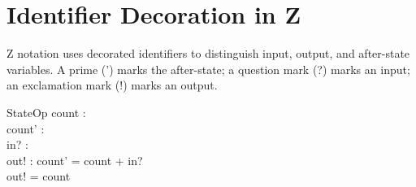 \documentclass[a4paper,10pt,fleqn]{article}
\begin{document}
\section*{Identifier Decoration in Z}

\noindent Z notation uses decorated identifiers to distinguish input, output, and after-state variables. A prime (') marks the after-state; a question mark (?) marks an input; an exclamation mark (!) marks an output.

\bigskip

\begin{schema}{StateOp}
count : \nat \\
count' : \nat \\
in? : \nat \\
out! : \nat
\where
count' = count + in? \\
out! = count
\end{schema}
\end{document}
